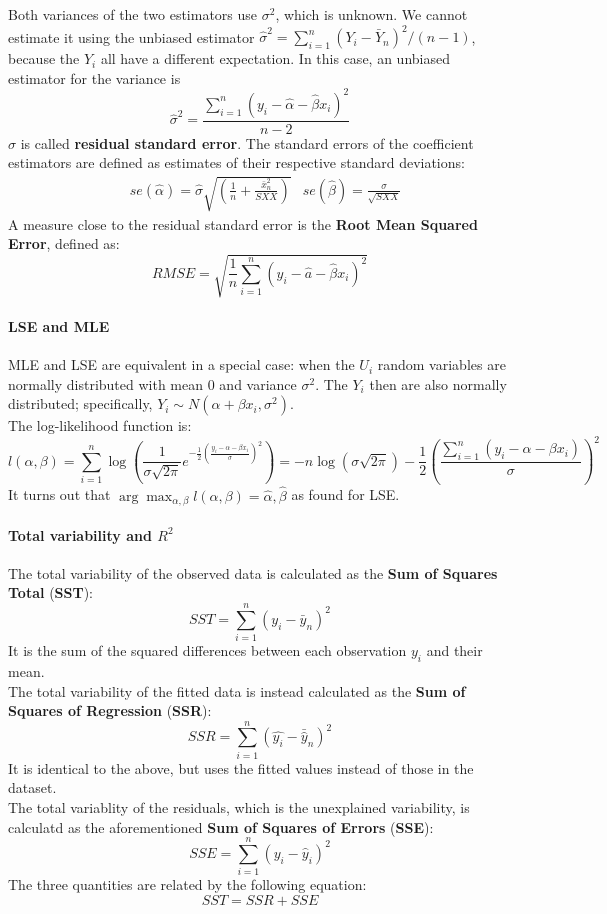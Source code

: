 Both variances of the two estimators use $\sigma^2$, which is unknown. We cannot estimate it using the unbiased estimator $\hat{\sigma}^2 = \sum_{i=1}^n (Y_i - \bar{Y}_n)^2/(n-1)$, because the $Y_i$ all have a different expectation. In this case, an unbiased estimator for the variance is
\[
    \hat{\sigma}^2 = \frac{\sum_{i=1}^n (y_i - \hat{\alpha} - \hat{\beta} x_i)^2}{n-2}
\]
$\hat{\sigma}$ is called \textbf{residual standard error}. The standard errors of the coefficient estimators are defined as estimates of their respective standard deviations:
\begin{align*}
    &se(\hat{\alpha}) = \hat{\sigma} \sqrt{\left( \frac{1}{n} + \frac{\bar{x}_n^2}{SXX} \right)} &se(\hat{\beta}) = \frac{\sigma}{\sqrt{SXX}}
\end{align*}
A measure close to the residual standard error is the \textbf{Root Mean Squared Error}, defined as:
\[
    RMSE = \sqrt{\frac{1}{n} \sum_{i=1}^n (y_i - \hat{a} - \hat{\beta}x_i)^2}
\]

\paragraph{LSE and MLE}
MLE and LSE are equivalent in a special case: when the $U_i$ random variables are normally distributed with mean 0 and variance $\sigma^2$. The $Y_i$ then are also normally distributed; specifically, $Y_i \sim N(\alpha + \beta x_i, \sigma^2)$. \\
The log-likelihood function is:
\[
    l(\alpha, \beta) = \sum_{i=1}^n \log \left( \frac{1}{\sigma \sqrt{2 \pi}} e^{-\frac{1}{2} \left(\frac{y_i - \alpha - \beta x_i}{\sigma}\right)^2}\right) = -n \log(\sigma \sqrt{2 \pi}) - \frac{1}{2} \left(\frac{\sum_{i=1}^n (y_i - \alpha - \beta x_i)}{\sigma}\right)^2
\]
It turns out that $\arg \max_{\alpha, \beta} l(\alpha, \beta) = \hat{\alpha}, \hat{\beta}$ as found for LSE.

\paragraph{Total variability and $R^2$}
The total variability of the observed data is calculated as the \textbf{Sum of Squares Total} (\textbf{SST}):
\[
    SST = \sum_{i=1}^n (y_i - \bar{y}_n)^2
\]
It is the sum of the squared differences between each observation $y_i$ and their mean.\\
The total variability of the fitted data is instead calculated as the \textbf{Sum of Squares of Regression} (\textbf{SSR}):
\[
    SSR = \sum_{i=1}^n (\hat{y_i} - \bar{\hat{y}}_n)^2
\]
It is identical to the above, but uses the fitted values instead of those in the dataset.\\
The total variablity of the residuals, which is the unexplained variability, is calculatd as the aforementioned \textbf{Sum of Squares of Errors} (\textbf{SSE}):
\[
    SSE = \sum_{i=1}^n (y_i - \hat{y}_i)^2
\]
The three quantities are related by the following equation:
\[
    SST = SSR + SSE
\]

